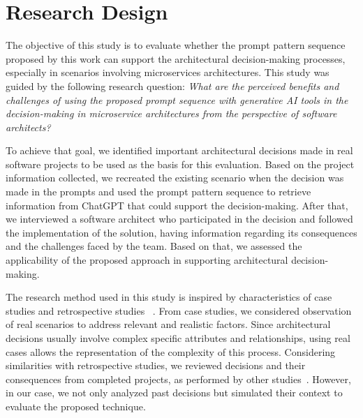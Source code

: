 \documentclass[runningheads]{llncs}
\begin{document}
\section{Research Design}

The objective of this study is to evaluate whether the prompt pattern sequence proposed by this work can support the architectural decision-making processes, especially in scenarios involving microservices architectures. This study was guided by the following research question: \textit{What are the perceived benefits and challenges of using the proposed prompt sequence with generative AI tools in the decision-making in microservice architectures from the perspective of software architects?} 

To achieve that goal, we identified important architectural decisions made in real software projects to be used as the basis for this evaluation. Based on the project information collected, we recreated the existing scenario when the decision was made in the prompts and used the prompt pattern sequence to retrieve information from ChatGPT that could support the decision-making. After that, we interviewed a software architect who participated in the decision and followed the implementation of the solution, having information regarding its consequences and the challenges faced by the team. Based on that, we assessed the applicability of the proposed approach in supporting architectural decision-making.

The research method used in this study is inspired by characteristics of case studies\cite{runeson2012case} and retrospective studies ~\cite{desouza2005experiences}. From case studies, we considered observation of real scenarios to address relevant and realistic factors. Since architectural decisions usually involve complex specific attributes and relationships, using real cases allows the representation of the complexity of this process. Considering similarities with retrospective studies, we reviewed decisions and their consequences from completed projects, as performed by other studies~\cite{hayes2011impact}. However, in our case, we not only analyzed past decisions but simulated their context to evaluate the proposed technique. 

\end{document}
